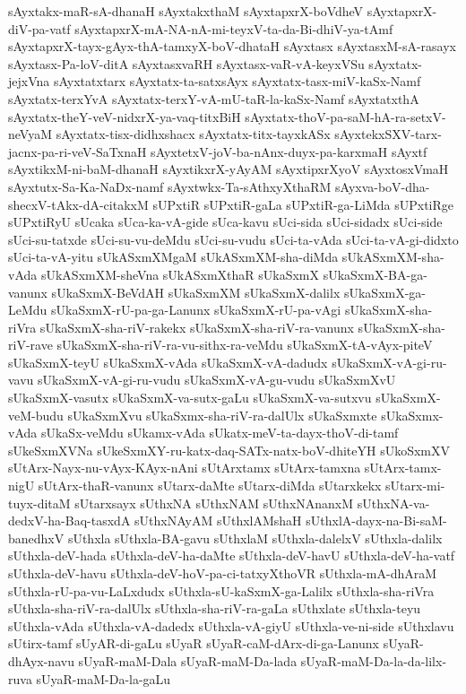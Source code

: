 {sAyxtakx-maR-sA-dhanaH
sAyxtakxthaM
sAyxtapxrX-boVdheV
sAyxtapxrX-diV-pa-vatf
sAyxtapxrX-mA-NA-nA-mi-teyxV-ta-da-Bi-dhiV-ya-tAmf
sAyxtapxrX-tayx-gAyx-thA-tamxyX-boV-dhataH
sAyxtasx
sAyxtasxM-sA-rasayx
sAyxtasx-Pa-loV-ditA
sAyxtasxvaRH
sAyxtasx-vaR-vA-keyxVSu
sAyxtatx-jejxVna
sAyxtatxtarx
sAyxtatx-ta-satxsAyx
sAyxtatx-tasx-miV-kaSx-Namf
sAyxtatx-terxYvA
sAyxtatx-terxY-vA-mU-taR-la-kaSx-Namf
sAyxtatxthA
sAyxtatx-theY-veV-nidxrX-ya-vaq-titxBiH
sAyxtatx-thoV-pa-saM-hA-ra-setxV-neVyaM
sAyxtatx-tisx-didhxshacx
sAyxtatx-titx-tayxkASx
sAyxtekxSXV-tarx-jacnx-pa-ri-veV-SaTxnaH
sAyxtetxV-joV-ba-nAnx-duyx-pa-karxmaH
sAyxtf
sAyxtikxM-ni-baM-dhanaH
sAyxtikxrX-yAyAM
sAyxtipxrXyoV
sAyxtosxVmaH
sAyxtutx-Sa-Ka-NaDx-namf
sAyxtwkx-Ta-sAthxyXthaRM
sAyxva-boV-dha-shecxV-tAkx-dA-citakxM
sUPxtiR
sUPxtiR-gaLa
sUPxtiR-ga-LiMda
sUPxtiRge
sUPxtiRyU
sUcaka
sUca-ka-vA-gide
sUca-kavu
sUci-sida
sUci-sidadx
sUci-side
sUci-su-tatxde
sUci-su-vu-deMdu
sUci-su-vudu
sUci-ta-vAda
sUci-ta-vA-gi-didxto
sUci-ta-vA-yitu
sUkASxmXMgaM
sUkASxmXM-sha-diMda
sUkASxmXM-sha-vAda
sUkASxmXM-sheVna
sUkASxmXthaR
sUkaSxmX
sUkaSxmX-BA-ga-vanunx
sUkaSxmX-BeVdAH
sUkaSxmXM
sUkaSxmX-dalilx
sUkaSxmX-ga-LeMdu
sUkaSxmX-rU-pa-ga-Lanunx
sUkaSxmX-rU-pa-vAgi
sUkaSxmX-sha-riVra
sUkaSxmX-sha-riV-rakekx
sUkaSxmX-sha-riV-ra-vanunx
sUkaSxmX-sha-riV-rave
sUkaSxmX-sha-riV-ra-vu-sithx-ra-veMdu
sUkaSxmX-tA-vAyx-piteV
sUkaSxmX-teyU
sUkaSxmX-vAda
sUkaSxmX-vA-dadudx
sUkaSxmX-vA-gi-ru-vavu
sUkaSxmX-vA-gi-ru-vudu
sUkaSxmX-vA-gu-vudu
sUkaSxmXvU
sUkaSxmX-vasutx
sUkaSxmX-va-sutx-gaLu
sUkaSxmX-va-sutxvu
sUkaSxmX-veM-budu
sUkaSxmXvu
sUkaSxmx-sha-riV-ra-dalUlx
sUkaSxmxte
sUkaSxmx-vAda
sUkaSx-veMdu
sUkamx-vAda
sUkatx-meV-ta-dayx-thoV-di-tamf
sUkeSxmXVNa
sUkeSxmXY-ru-katx-daq-SATx-natx-boV-dhiteYH
sUkoSxmXV
sUtArx-Nayx-nu-vAyx-KAyx-nAni
sUtArxtamx
sUtArx-tamxna
sUtArx-tamx-nigU
sUtArx-thaR-vanunx
sUtarx-daMte
sUtarx-diMda
sUtarxkekx
sUtarx-mi-tuyx-ditaM
sUtarxsayx
sUthxNA
sUthxNAM
sUthxNAnanxM
sUthxNA-va-dedxV-ha-Baq-tasxdA
sUthxNAyAM
sUthxlAMshaH
sUthxlA-dayx-na-Bi-saM-banedhxV
sUthxla
sUthxla-BA-gavu
sUthxlaM
sUthxla-dalelxV
sUthxla-dalilx
sUthxla-deV-hada
sUthxla-deV-ha-daMte
sUthxla-deV-havU
sUthxla-deV-ha-vatf
sUthxla-deV-havu
sUthxla-deV-hoV-pa-ci-tatxyXthoVR
sUthxla-mA-dhAraM
sUthxla-rU-pa-vu-LaLxdudx
sUthxla-sU-kaSxmX-ga-Lalilx
sUthxla-sha-riVra
sUthxla-sha-riV-ra-dalUlx
sUthxla-sha-riV-ra-gaLa
sUthxlate
sUthxla-teyu
sUthxla-vAda
sUthxla-vA-dadedx
sUthxla-vA-giyU
sUthxla-ve-ni-side
sUthxlavu
sUtirx-tamf
sUyAR-di-gaLu
sUyaR
sUyaR-caM-dArx-di-ga-Lanunx
sUyaR-dhAyx-navu
sUyaR-maM-Dala
sUyaR-maM-Da-lada
sUyaR-maM-Da-la-da-lilx-ruva
sUyaR-maM-Da-la-gaLu
}

